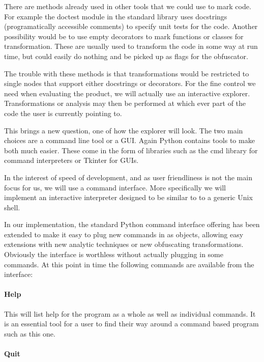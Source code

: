 \documentclass{report}
\begin{document}
There are methods already used in other tools that we could use to mark code. For example the doctest module in the standard
library uses docstrings (programatically accessible comments) to specify unit tests for the code. Another possibility would
be to use empty decorators to mark functions or classes for transformation. These are usually used to transform the code in
some way at run time, but could easily do nothing and be picked up as flags for the obfuscator.

The trouble with these methods is that transformations would be restricted to single nodes that support either docstrings or
decorators. For the fine control we need when evaluating the product, we will actually use an interactive explorer.
Transformations or analysis may then be performed at which ever part of the code the user is currently pointing to.

This brings a new question, one of how the explorer will look. The two main choices are a command line tool or a GUI. Again
Python contains tools to make both much easier. These come in the form of libraries such as the cmd library \cite{pycmd} for command
interpreters or Tkinter \cite{pytkinter} for GUIs.

In the interest of speed of development, and as user friendliness is not the main focus for us, we will use a command interface.
More specifically we will implement an interactive interpreter designed to be similar to to a generic Unix shell.

In our implementation, the standard Python command interface offering has been extended to make it easy to plug new commands in as
objects, allowing easy extensions with new analytic techniques or new obfuscating transformations. Obviously the
interface is worthless without actually plugging in some commands. At this point in time the following commands are available from the
interface:

\paragraph{Help}

This will list help for the program as a whole as well as individual commands. It is an essential tool for a user to find their way around a
command based program such as this one.

\paragraph{Quit}
\end{document}
